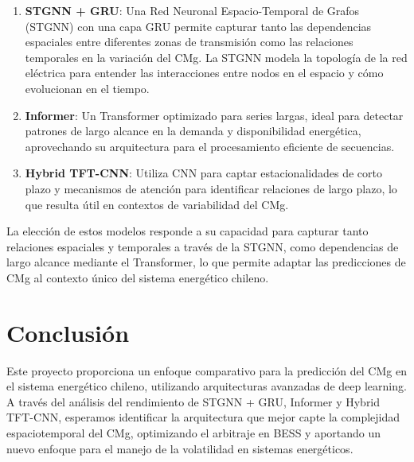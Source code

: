 \documentclass[11pt, twocolumn]{article}
\begin{document}
\begin{enumerate}
    \item \textbf{STGNN + GRU}: Una Red Neuronal Espacio-Temporal de Grafos (STGNN) con una capa GRU permite capturar tanto las dependencias espaciales entre diferentes zonas de transmisión como las relaciones temporales en la variación del CMg. La STGNN modela la topología de la red eléctrica para entender las interacciones entre nodos en el espacio y cómo evolucionan en el tiempo.
    
    \item \textbf{Informer}: Un Transformer optimizado para series largas, ideal para detectar patrones de largo alcance en la demanda y disponibilidad energética, aprovechando su arquitectura para el procesamiento eficiente de secuencias.

    \item \textbf{Hybrid TFT-CNN}: Utiliza CNN para captar estacionalidades de corto plazo y mecanismos de atención para identificar relaciones de largo plazo, lo que resulta útil en contextos de variabilidad del CMg.
\end{enumerate}

La elección de estos modelos responde a su capacidad para capturar tanto relaciones espaciales y temporales a través de la STGNN, como dependencias de largo alcance mediante el Transformer, lo que permite adaptar las predicciones de CMg al contexto único del sistema energético chileno.

\section{Conclusión}
Este proyecto proporciona un enfoque comparativo para la predicción del CMg en el sistema energético chileno, utilizando arquitecturas avanzadas de deep learning. A través del análisis del rendimiento de STGNN + GRU, Informer y Hybrid TFT-CNN, esperamos identificar la arquitectura que mejor capte la complejidad espaciotemporal del CMg, optimizando el arbitraje en BESS y aportando un nuevo enfoque para el manejo de la volatilidad en sistemas energéticos.
\end{document}
